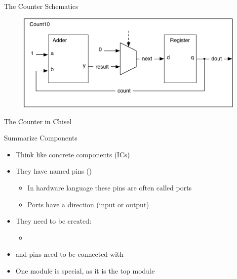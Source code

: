 \begin{frame}[fragile]{The Counter Schematics}
\begin{figure}
  \includegraphics[scale=0.6]{../figures/components-counter}
\end{figure}
\end{frame}

\begin{frame}[fragile]{The Counter in Chisel}
\end{frame}

\begin{frame}[fragile]{Summarize Components}
\begin{itemize}
\item Think like concrete components (ICs)
\item They have named pins ()
\begin{itemize}
\item In hardware language these pins are often called ports
\item Ports have a direction (input or output)
\end{itemize}
\item They need to be created:
\begin{itemize}
\item {}
\end{itemize}
\item and pins need to be connected with \code{:=}
\item One module is special, as it is the top module
\end{itemize}
\end{frame}





